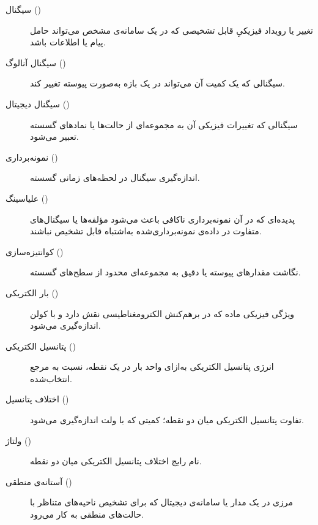\begin{description}
  \item[سیگنال ()] تغییر یا رویداد فیزیکیِ قابل تشخیصی که در یک سامانه‌ی مشخص می‌تواند حامل پیام یا اطلاعات باشد.
  \item[سیگنال آنالوگ ()] سیگنالی که یک کمیت آن می‌تواند در یک بازه به‌صورت پیوسته تغییر کند.
  \item[سیگنال دیجیتال ()] سیگنالی که تغییرات فیزیکی آن به مجموعه‌ای از حالت‌ها یا نمادهای گسسته تعبیر می‌شود.
  \item[نمونه‌برداری ()] اندازه‌گیری سیگنال در لحظه‌های زمانی گسسته.
  \item[علیاسینگ ()] پدیده‌ای که در آن نمونه‌برداری ناکافی باعث می‌شود مؤلفه‌ها یا سیگنال‌های متفاوت در داده‌ی نمونه‌برداری‌شده به‌اشتباه قابل تشخیص نباشند.
  \item[کوانتیزه‌سازی ()] نگاشت مقدارهای پیوسته یا دقیق به مجموعه‌ای محدود از سطح‌های گسسته.
  \item[بار الکتریکی ()] ویژگی فیزیکی ماده که در برهم‌کنش الکترومغناطیسی نقش دارد و با کولن اندازه‌گیری می‌شود.
  \item[پتانسیل الکتریکی ()] انرژی پتانسیل الکتریکی به‌ازای واحد بار در یک نقطه، نسبت به مرجع انتخاب‌شده.
  \item[اختلاف پتانسیل ()] تفاوت پتانسیل الکتریکی میان دو نقطه؛ کمیتی که با ولت اندازه‌گیری می‌شود.
  \item[ولتاژ ()] نام رایج اختلاف پتانسیل الکتریکی میان دو نقطه.
  \item[آستانه‌ی منطقی ()] مرزی در یک مدار یا سامانه‌ی دیجیتال که برای تشخیص ناحیه‌های متناظر با حالت‌های منطقی به کار می‌رود.
\end{description}

